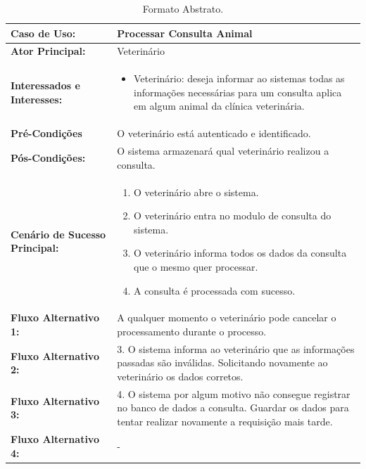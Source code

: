 \documentclass[a4paper, 12pt]{article}
\begin{document}
	\begin{table}[H]
		\centering
		\begin{tabular}{p{0.3\linewidth}  p{0.7\linewidth}}
			\toprule
			
			\textbf{Caso de Uso:} & Processar Consulta Animal\\ \midrule
			\textbf{Ator Principal:} & Veterinário \\ \midrule
			\textbf{Interessados e Interesses:} & 
				\begin{itemize}
					\item Veterinário: deseja informar ao sistemas todas as informações necessárias para um consulta aplica em algum animal da clínica veterinária.

				\end{itemize} \\ \midrule
			\textbf{Pré-Condições} & O veterinário está autenticado e identificado. \\ \midrule
			\textbf{Pós-Condições:} & O sistema armazenará qual veterinário realizou a consulta. \\ \midrule
			\textbf{Cenário de Sucesso Principal:} & 
			\begin{enumerate}
				\item O veterinário abre o sistema.
				\item O veterinário entra no modulo de consulta do sistema.
				\item O veterinário informa todos os dados da consulta que o mesmo quer processar.
				\item A consulta é processada com sucesso.
			\end{enumerate} \\ \midrule
			
			\textbf{Fluxo Alternativo 1:} & A qualquer momento o veterinário pode cancelar o processamento durante o processo. \\ \midrule
			\textbf{Fluxo Alternativo 2:} & 3. O sistema informa ao veterinário que as informações passadas são inválidas. Solicitando novamente ao veterinário os dados corretos. \\ \midrule
			\textbf{Fluxo Alternativo 3:} & 4. O sistema por algum motivo não consegue registrar no banco de dados a consulta. Guardar os dados para tentar realizar novamente a requisição mais tarde. \\ \midrule
			\textbf{Fluxo Alternativo 4:} & - \\ 
			
			\bottomrule
		\end{tabular}
		\caption{ {\small Formato Abstrato.}}
	\end{table}
\end{document}

